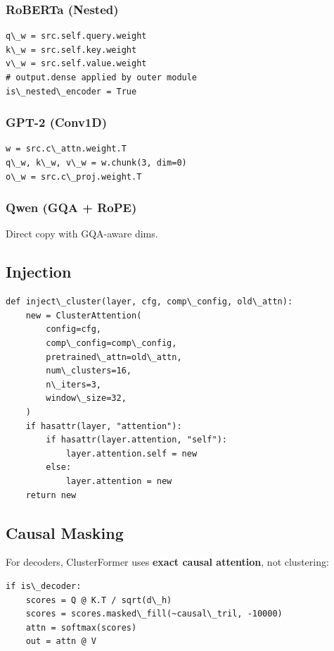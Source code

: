 \subsubsection{RoBERTa (Nested)}
\begin{lstlisting}
q\_w = src.self.query.weight
k\_w = src.self.key.weight
v\_w = src.self.value.weight
# output.dense applied by outer module
is\_nested\_encoder = True
\end{lstlisting}

\subsubsection{GPT-2 (Conv1D)}
\begin{lstlisting}
w = src.c\_attn.weight.T
q\_w, k\_w, v\_w = w.chunk(3, dim=0)
o\_w = src.c\_proj.weight.T
\end{lstlisting}

\subsubsection{Qwen (GQA + RoPE)}
Direct copy with GQA-aware dims.

\subsection{Injection}

\begin{lstlisting}
def inject\_cluster(layer, cfg, comp\_config, old\_attn):
    new = ClusterAttention(
        config=cfg,
        comp\_config=comp\_config,
        pretrained\_attn=old\_attn,
        num\_clusters=16,
        n\_iters=3,
        window\_size=32,
    )
    if hasattr(layer, "attention"):
        if hasattr(layer.attention, "self"):
            layer.attention.self = new
        else:
            layer.attention = new
    return new
\end{lstlisting}

\subsection{Causal Masking}

For decoders, ClusterFormer uses \textbf{exact causal attention}, not clustering:

\begin{lstlisting}
if is\_decoder:
    scores = Q @ K.T / sqrt(d\_h)
    scores = scores.masked\_fill(~causal\_tril, -10000)
    attn = softmax(scores)
    out = attn @ V
\end{lstlisting}

